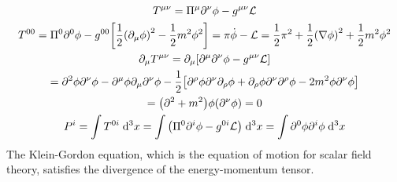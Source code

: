 \documentclass{report}
\theoremstyle{definition}
\begin{document}
\begin{chapter10}
	\begin{gather*}
		T^{\mu\nu} = \Pi^{\mu}\partial^{\nu}\phi - g^{\mu\nu}\cal{L} \\
		T^{00} = \Pi^{0}\partial^{0}\phi - g^{00}\bqty{\frac{1}{2}\pqty{\partial_{\mu}\phi}^2 - \frac{1}{2}m^2\phi^2} = \pi\dot{\phi} - \mathcal{L} = \frac{1}{2}\pi^2 + \frac{1}{2}\pqty{\nabla{\phi}}^2 + \frac{1}{2}m^2\phi^2 \\
		\partial_{\mu}T^{\mu\nu} = \partial_{\mu}\bqty{\partial^{\mu}\partial^{\nu}\phi - g^{\mu\nu}\cal{L}} \\
		= \partial^2\phi\partial^{\nu}\phi - \partial^{\mu}\phi\partial_{\mu}\partial^{\nu}\phi - \frac{1}{2}\bqty{\partial^{\rho}\phi \partial^{\nu}\partial_{\rho}\phi+ \partial_{\rho}\phi\partial^{\nu}\partial^{\rho}\phi - 2m^2\phi\partial^{\nu}\phi} \\
		= \pqty{\partial^2 + m^2}\phi\pqty{\partial^{\nu}\phi} = 0 \\
		P^i = \int T^{0i}\;\dd^3{x} = \int \pqty{\Pi^0\partial^i \phi - g^{0i}\cal{L}}\;\dd^3{x} = \int \partial^0\phi\partial^i\phi\;\dd^3{x}
	\end{gather*}
	The Klein-Gordon equation, which is the equation of motion for scalar field theory, satisfies the divergence of the energy-momentum tensor.
\end{chapter10}
\end{document}
